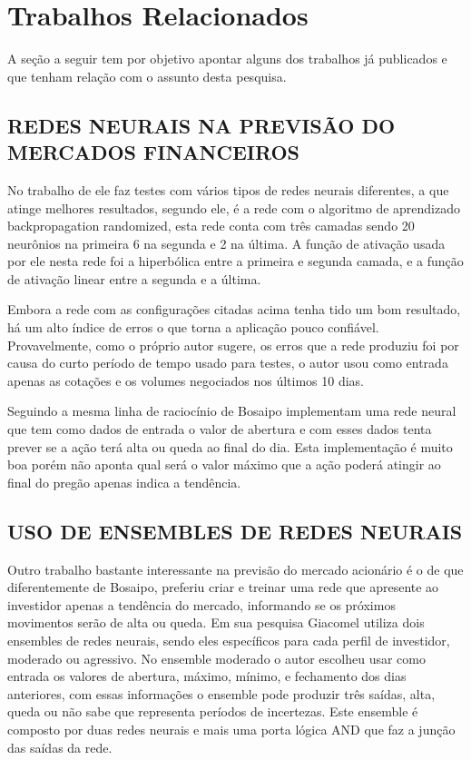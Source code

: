 \chapter{Trabalhos Relacionados}
A seção a seguir tem por objetivo apontar alguns dos trabalhos já publicados e que tenham relação com o assunto desta pesquisa. 

\section{REDES NEURAIS NA PREVISÃO DO MERCADOS FINANCEIROS}
No trabalho de  ele faz testes com vários tipos de redes neurais diferentes, a que atinge melhores resultados, segundo ele, é a rede com o algoritmo de aprendizado backpropagation randomized, esta rede conta com três camadas sendo 20 neurônios na primeira 6 na segunda e 2 na última. A função de ativação usada por ele nesta rede foi a hiperbólica entre a primeira e segunda camada, e a função de ativação linear entre a segunda e a última.

Embora a rede com as configurações citadas acima tenha tido um bom resultado, há um alto índice de erros o que torna a aplicação pouco confiável. Provavelmente, como o próprio autor sugere, os erros que a rede produziu foi por causa do curto período de tempo usado para testes, o autor usou como entrada apenas as cotações e os volumes negociados nos últimos 10 dias.

Seguindo a mesma linha de raciocínio de Bosaipo  implementam uma rede neural que tem como dados de entrada o valor de abertura e com esses dados tenta prever se a ação terá alta ou queda ao final do dia. Esta implementação é muito boa porém não aponta qual será o valor máximo que a ação poderá atingir ao final do pregão apenas indica a tendência.

\section{USO DE ENSEMBLES DE REDES NEURAIS}
Outro trabalho bastante interessante na previsão do mercado acionário é o de  que diferentemente de Bosaipo, preferiu criar e treinar uma rede que apresente ao investidor apenas a tendência do mercado, informando se os próximos movimentos serão de alta ou queda. 
Em sua pesquisa Giacomel utiliza dois ensembles de redes neurais, sendo eles específicos para cada perfil de investidor, moderado ou agressivo. No ensemble moderado o autor escolheu usar como entrada os valores de abertura, máximo, mínimo, e fechamento dos dias anteriores, com essas informações o ensemble pode produzir três saídas, alta, queda ou não sabe que representa períodos de incertezas. Este ensemble é composto por duas redes neurais e mais uma porta lógica AND que faz a junção das saídas da rede.

